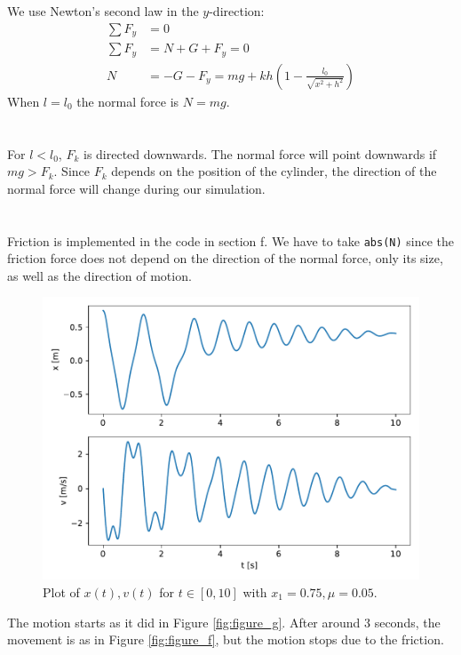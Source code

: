 \documentclass[a4paper,10pt,english]{article}
\begin{document}
\section{}
We use Newton's second law in the $y$-direction:
\begin{align*}
    \sum F_y &= 0 \\
    \sum F_y &= N+G+F_y = 0 \\
    N &= -G-F_y = mg + k h
        \left( 
            1 - \frac{l_0}{\sqrt{x^2+h^2}}
        \right)
\end{align*}
When $l=l_0$ the normal force is $N=mg$.

\section{}
For $l<l_0$, $F_k$ is directed downwards. The normal force will point downwards if $mg>F_k$. Since $F_k$ depends on the position of the cylinder, the direction of the normal force will change during our simulation.

\newpage
\section{}
Friction is implemented in the code in section f. We have to take \verb|abs(N)| since the friction force does not depend on the direction of the normal force, only its size, as well as the direction of motion.

\begin{figure}[h]
    \centering
    \includegraphics[scale=0.7]{figure_k.pdf}
    \caption{Plot of $x(t), v(t)$ for $t\in[0, 10]$ with $x_1=0.75, \mu=0.05$.}
    \label{fig:figure_k}
\end{figure}
The motion  starts as it did in Figure \ref{fig:figure_g}. After around 3 seconds, the movement is as in Figure \ref{fig:figure_f}, but the motion stops due to the friction.
\end{document}

